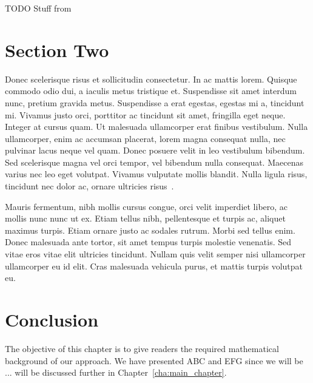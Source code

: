 




TODO Stuff from \cite{abadi1991}


\section{Section Two}
\label{sec:section_two}

Donec scelerisque risus et sollicitudin consectetur. In ac mattis lorem. Quisque commodo odio dui, a iaculis metus tristique et. Suspendisse sit amet interdum nunc, pretium gravida metus. Suspendisse a erat egestas, egestas mi a, tincidunt mi. Vivamus justo orci, porttitor ac tincidunt sit amet, fringilla eget neque. Integer at cursus quam. Ut malesuada ullamcorper erat finibus vestibulum. Nulla ullamcorper, enim ac accumsan placerat, lorem magna consequat nulla, nec pulvinar lacus neque vel quam. Donec posuere velit in leo vestibulum bibendum. Sed scelerisque magna vel orci tempor, vel bibendum nulla consequat. Maecenas varius nec leo eget volutpat. Vivamus vulputate mollis blandit. Nulla ligula risus, tincidunt nec dolor ac, ornare ultricies risus~\cite{Schmidt1993aa}.

Mauris fermentum, nibh mollis cursus congue, orci velit imperdiet libero, ac mollis nunc nunc ut ex. Etiam tellus nibh, pellentesque et turpis ac, aliquet maximus turpis. Etiam ornare justo ac sodales rutrum. Morbi sed tellus enim. Donec malesuada ante tortor, sit amet tempus turpis molestie venenatis. Sed vitae eros vitae elit ultricies tincidunt. Nullam quis velit semper nisi ullamcorper ullamcorper eu id elit. Cras malesuada vehicula purus, et mattis turpis volutpat eu.



\section{Conclusion}
\label{sec:background_conclusion}

The objective of this chapter is to give readers the required mathematical background of our approach. We have presented ABC and EFG since we will be ...  will be discussed further in Chapter~\ref{cha:main_chapter}.

